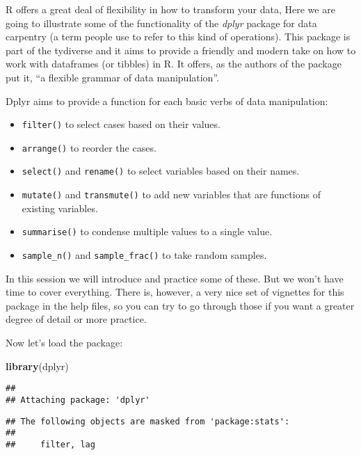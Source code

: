 \documentclass[
]{book}
\newenvironment{Shaded}{\begin{snugshade}}{\end{snugshade}}
\newcommand{\FunctionTok}[1]{\textcolor[rgb]{0.13,0.29,0.53}{\textbf{#1}}}
\newcommand{\NormalTok}[1]{#1}
\providecommand{\tightlist}{%
  \setlength{\itemsep}{0pt}\setlength{\parskip}{0pt}}
\begin{document}
R offers a great deal of flexibility in how to transform your data, Here we are going to illustrate some of the functionality of the \emph{dplyr} package for data carpentry (a term people use to refer to this kind of operations). This package is part of the tydiverse and it aims to provide a friendly and modern take on how to work with dataframes (or tibbles) in R. It offers, as the authors of the package put it, ``a flexible grammar of data manipulation''.

Dplyr aims to provide a function for each basic verbs of data manipulation:

\begin{itemize}
\tightlist
\item
  \texttt{filter()} to select cases based on their values.
\item
  \texttt{arrange()} to reorder the cases.
\item
  \texttt{select()} and \texttt{rename()} to select variables based on their names.
\item
  \texttt{mutate()} and \texttt{transmute()} to add new variables that are functions of existing variables.
\item
  \texttt{summarise()} to condense multiple values to a single value.
\item
  \texttt{sample\_n()} and \texttt{sample\_frac()} to take random samples.
\end{itemize}

In this session we will introduce and practice some of these. But we won't have time to cover everything. There is, however, a very nice set of vignettes for this package in the help files, so you can try to go through those if you want a greater degree of detail or more practice.

Now let's load the package:

\begin{Shaded}
\begin{Highlighting}[]
\FunctionTok{library}\NormalTok{(dplyr)}
\end{Highlighting}
\end{Shaded}

\begin{verbatim}
## 
## Attaching package: 'dplyr'
\end{verbatim}

\begin{verbatim}
## The following objects are masked from 'package:stats':
## 
##     filter, lag
\end{verbatim}
\end{document}
